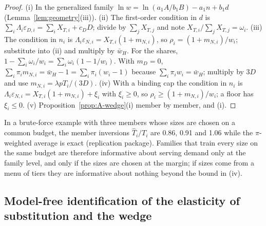 \begin{proof}
(i) In the generalized family $\ln w=\ln(a_1A/b_1B)-a_1n+b_1d$ (Lemma~\ref{lem:geometry}(iii)). (ii) The first-order
condition in $d$ is $\sum_i\Lambda_i\varepsilon_{D,i}=\sum_iX_{T,i}+c_DD$; divide by $\sum_jX_{T,j}$ and note
$X_{T,i}/\sum_jX_{T,j}=\omega_i$. (iii) The condition in $n_i$ is $\Lambda_i\varepsilon_{N,i}=X_{T,i}(1+m_{N,i})$, so
$\rho_i=(1+m_{N,i})/w_i$; substitute into (ii) and multiply by $\bar w_H$. For the shares,
$1-\sum_i\omega_i/w_i=\sum_i\omega_i(1-1/w_i)$. With $m_D=0$, $\sum_i\pi_im_{N,i}=\bar w_H-1=\sum_i\pi_i(w_i-1)$ because
$\sum_i\pi_iw_i=\bar w_H$; multiply by $3D$ and use $m_{N,i}=\lambda pT_i/(3D)$. (iv) With a binding cap the condition in
$n_i$ is $\Lambda_i\varepsilon_{N,i}=X_{T,i}(1+m_{N,i})+\xi_i$ with $\xi_i\ge0$, so $\rho_i\ge(1+m_{N,i})/w_i$; a floor has
$\xi_i\le0$. (v) Proposition~\ref{prop:A-wedge}(i) member by member, and (i).
\end{proof}

\begin{remark}
In a brute-force example with three members whose sizes are chosen on a common budget, the member inversions
$\hat T_i/T_i$ are 0.86, 0.91 and 1.06 while the $\pi$-weighted average is exact (replication package). Families that train
every size on the same budget are therefore informative about serving demand only at the family level, and only if the
sizes are chosen at the margin; if sizes come from a menu of tiers they are informative about nothing beyond the bound in
(iv).
\end{remark}

\subsection{Model-free identification of the elasticity of substitution and the wedge}\label{app:modelfree}

